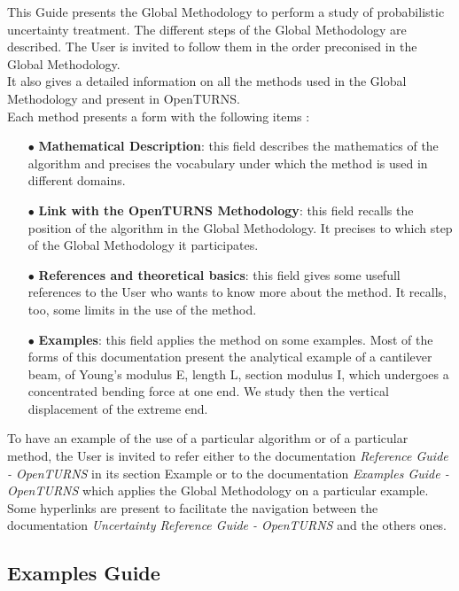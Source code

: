 \documentclass[11pt]{article}
\begin{document}
This Guide presents the Global Methodology to perform a study of probabilistic uncertainty treatment. The different steps of the Global Methodology are described. The User is invited to follow them in the order preconised in the Global Methodology.\\

It also gives a detailed information on all the methods used in the Global Methodology and present in OpenTURNS.\\

Each method presents a form with the following items :
\begin{itemize}
\item[$\bullet$] {\bf Mathematical Description}: this field describes the mathematics of the algorithm and precises the vocabulary under which the method is used in different domains.
\item[$\bullet$] {\bf Link with the OpenTURNS Methodology}: this field recalls the position of the algorithm in the Global Methodology. It precises to which step of the Global Methodology it participates.
\item[$\bullet$] {\bf References and theoretical basics}: this field gives some usefull references to the User who wants to know more about the method. It recalls, too, some limits in the use of the method.
\item[$\bullet$] {\bf Examples}: this field applies the method on some examples. Most of the forms of this documentation present the analytical example of a cantilever beam, of Young's modulus E, length L, section modulus I, which undergoes a concentrated bending force at one end. We study then the vertical displacement of the extreme end.
\end{itemize}

To have an example of the use of a particular algorithm or of a particular method, the User is invited to refer either to the documentation {\itshape Reference Guide - OpenTURNS}  in its section {Example} or to the documentation {\itshape Examples Guide - OpenTURNS} which applies the Global Methodology on a particular example.\\

Some hyperlinks are present to facilitate the navigation between the documentation {\itshape Uncertainty Reference Guide - OpenTURNS} and the others ones.


\subsection{Examples Guide}
\end{document}
